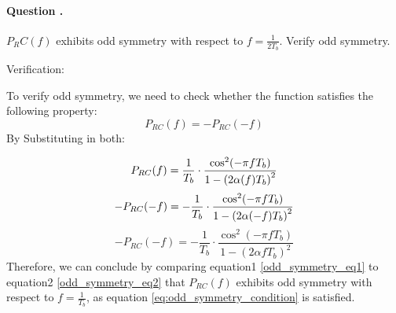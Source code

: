 \documentclass[14pt,a4paper]{report}
\newcounter{question}
\newcommand*\question{%
\stepcounter{question}%
\paragraph{Question \thesection.\thequestion}}
\begin{document}
\question
{
    $P_RC (f )$ exhibits odd symmetry with respect to $f = \frac{1}{2T_{b}}$. Verify odd symmetry.
}
\begin{answer_box*}

    Verification:

    To verify odd symmetry, we need to check whether the function satisfies the following property:
    \begin{equation}
        P_{RC}(f) = -P_{RC}(-f) \label{eq:odd_symmetry_condition}
    \end{equation}
    By Substituting in both:

    \begin{equation}
        P_{RC}(f) =  \frac{1}{T_b} \cdot \frac{\cos^2(-\pi f T_b)}{1 - \left({2\alpha (f)}{T_b}\right)^2} \label{odd_symmetry_eq1}  \\
    \end{equation}
    \begin{equation}
        -P_{RC}(-f) = - \frac{1}{T_b} \cdot \frac{\cos^2(-\pi f T_b)}{1 - \left({2\alpha (-f)}{T_b}\right)^2} \\
    \end{equation}  
    \begin{equation}
        -P_{RC}(-f) = - \frac{1}{T_b} \cdot \frac{\cos^2(-\pi f T_b)}{1 - \left({2\alpha f}{T_b}\right)^2} \label{odd_symmetry_eq2}
    \end{equation}
    Therefore, we can conclude by comparing equation1 \ref{odd_symmetry_eq1} to equation2 \ref{odd_symmetry_eq2} that $P_{RC}(f)$ exhibits odd symmetry with respect to $f = \frac{1}{T_b}$, as equation \ref{eq:odd_symmetry_condition} is satisfied.
\end{answer_box*}
\end{document}
